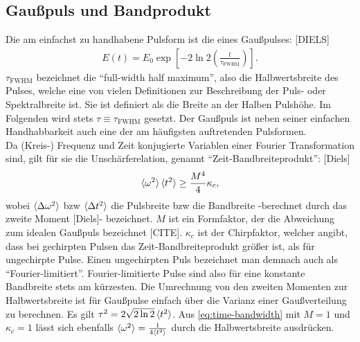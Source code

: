 \documentclass[twoside,        %
               BCOR12mm,       %
               english,ngerman, %
               fleqn,headsepline=false,footsepline=false
              ]{Vorlage/MFPREPORT}
\begin{document}
\subsection{Gaußpuls und Bandprodukt}
Die am einfachst zu handhabene Pulsform ist die eines Gaußpulses: [DIELS]
\begin{align}
    E(t)=E_0\exp\left[-2\ln 2\left(\frac{t}{\tau_{\text{FWHM}}}\right)\right].
    \label{eq:gaus}
\end{align}
$\tau_{\text{FWHM}}$ bezeichnet die ``full-width half maximum'', also die Halbwertsbreite des Pulses, welche eine von vielen Definitionen zur Beschreibung der Puls- oder Spektralbreite ist. Sie ist definiert als die Breite an der Halben Pulshöhe. Im Folgenden wird stets $\tau\equiv\tau_{\text{FWHM}}$ gesetzt. Der Gaußpuls ist neben seiner einfachen Handhabbarkeit auch eine der am häufigsten auftretenden Pulsformen.\\
Da (Kreis-) Frequenz und Zeit konjugierte Variablen einer Fourier Transformation sind, gilt für sie die Unschärferelation, genannt ``Zeit-Bandbreiteprodukt'': [Diels]
\begin{align}
    \braket{\omega^{2}}\braket{t^{2}} \geq \frac{M^{4}}{4}\kappa_c,
    \label{eq:time-bandwidth}
\end{align}
wobei $\braket{\Delta\omega^{2}}$ bzw $\braket{\Delta t^{2}}$ die Pulsbreite bzw die Bandbreite -berechnet durch das zweite Moment [Diels]- bezeichnet. $M$ ist ein Formfaktor, der die Abweichung zum idealen Gaußpuls bezeichnet [CITE]. $\kappa_c$ ist der Chirpfaktor, welcher angibt, dass bei gechirpten Pulsen das Zeit-Bandbreiteprodukt größer ist, als für ungechirpte Pulse. Einen ungechirpten Puls bezeichnet man demnach auch als ``Fourier-limitiert''. Fourier-limitierte Pulse sind also für eine konstante Bandbreite stets am kürzesten.
Die Umrechnung von den zweiten Momenten zur Halbwertsbreite ist für Gaußpulse einfach über die Varianz einer Gaußverteilung zu berechnen. Es gilt $\tau^2=2\sqrt{2 \ln 2}\braket{t^2}$. Aus \cref{eq:time-bandwidth} mit $M=1$ und $\kappa_c=1$ lässt sich ebenfalls $\braket{\omega^2}=\frac{1}{4 \braket{t^2}}$ durch die Halbwertsbreite ausdrücken.
\end{document}
